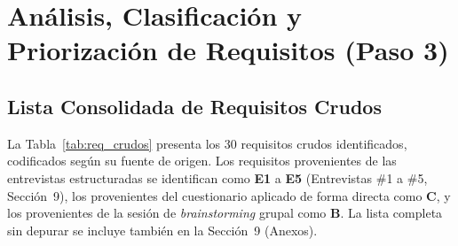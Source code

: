 \documentclass[journal,onecolumn]{IEEEtran}
\begin{document}
\newpage

\section{Análisis, Clasificación y Priorización de Requisitos (Paso 3)}

\subsection{Lista Consolidada de Requisitos Crudos}

La Tabla~\ref{tab:req_crudos} presenta los 30 requisitos crudos
identificados, codificados según su fuente de origen. Los requisitos
provenientes de las entrevistas estructuradas se identifican como
\textbf{E1} a \textbf{E5} (Entrevistas \#1 a \#5, Sección~9), los
provenientes del cuestionario aplicado de forma directa como \textbf{C}, y
los provenientes de la sesión de \textit{brainstorming} grupal como
\textbf{B}. La lista completa sin depurar se incluye también en la
Sección~9 (Anexos).
\end{document}

